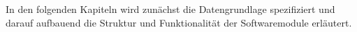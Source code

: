 
In den folgenden Kapiteln wird zunächst die Datengrundlage spezifiziert und darauf aufbauend die Struktur und Funktionalität der Softwaremodule erläutert.

\prever{
}




\prever{
}
